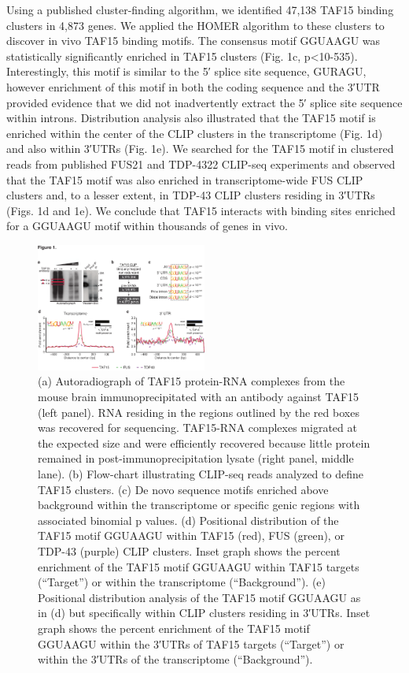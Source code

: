 Using a published cluster-finding algorithm\cite{Polymenidou2011}, we identified 47,138 TAF15 binding clusters in 4,873 genes. We applied the HOMER algorithm to these clusters to discover in vivo TAF15 binding motifs. The consensus motif GGUAAGU was statistically significantly enriched in TAF15 clusters (Fig. 1c, p<10-535). Interestingly, this motif is similar to the 5′ splice site sequence, GURAGU\cite{Shapiro1987}, however enrichment of this motif in both the coding sequence and the 3′UTR provided evidence that we did not inadvertently extract the 5′ splice site sequence within introns. Distribution analysis also illustrated that the TAF15 motif is enriched within the center of the CLIP clusters in the transcriptome (Fig. 1d) and also within 3′UTRs (Fig. 1e). We searched for the TAF15 motif in clustered reads from published FUS21 and TDP-4322 CLIP-seq experiments and observed that the TAF15 motif was also enriched in transcriptome-wide FUS CLIP clusters and, to a lesser extent, in TDP-43 CLIP clusters residing in 3′UTRs (Figs. 1d and 1e). We conclude that TAF15 interacts with binding sites enriched for a GGUAAGU motif within thousands of genes in vivo.

\begin{figure}[ht]
  \centering
  \includegraphics[width=0.5\textwidth]{chapter_2_figures/Figure_1}
  \caption[Figure 1. CLIP-seq reveals that TAF15 binds GGUAAGU motifs in the mouse brain]{(a) Autoradiograph of TAF15 protein-RNA complexes from the mouse brain immunoprecipitated with an antibody against TAF15 (left panel). RNA residing in the regions outlined by the red boxes was recovered for sequencing. TAF15-RNA complexes migrated at the expected size and were efficiently recovered because little protein remained in post-immunoprecipitation lysate (right panel, middle lane). (b) Flow-chart illustrating CLIP-seq reads analyzed to define TAF15 clusters. (c) De novo sequence motifs enriched above background within the transcriptome or specific genic regions with associated binomial p values. (d) Positional distribution of the TAF15 motif GGUAAGU within TAF15 (red), FUS (green), or TDP-43 (purple) CLIP clusters. Inset graph shows the percent enrichment of the TAF15 motif GGUAAGU within TAF15 targets (“Target”) or within the transcriptome (“Background”). (e) Positional distribution analysis of the TAF15 motif GGUAAGU as in (d) but specifically within CLIP clusters residing in 3′UTRs. Inset graph shows the percent enrichment of the TAF15 motif GGUAAGU within the 3′UTRs of TAF15 targets (“Target”) or within the 3′UTRs of the transcriptome (“Background”).}
  \label{fig:Figure_1}
  \end{figure}

